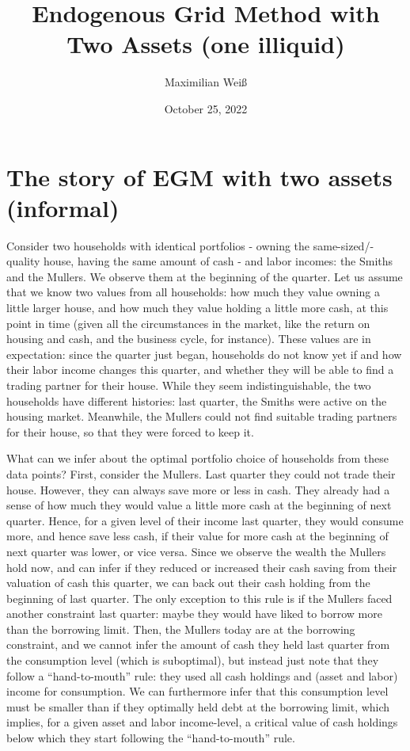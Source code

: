 \documentclass[11pt]{article} %
\title{Endogenous Grid Method with Two Assets (one illiquid)}
\author{Maximilian Weiß}
\date{October 25, 2022} %
\begin{document}
\maketitle

\section{The story of EGM with two assets (informal)}\label{sec:story}

Consider two households with identical portfolios - owning the same-sized/-quality house, having the same amount of cash - and labor incomes:
the Smiths and the Mullers. We observe them at the beginning of the quarter. Let us assume that we know two values from all households: how much they value owning a little larger house, and how much they value holding a little more cash, at this point in time
(given all the circumstances in the market, like the return on housing and cash, and the business cycle, for instance).
These values are in expectation: since the quarter just began, households do not know yet if and how their labor income changes this quarter,
and whether they will be able to find a trading partner for their house.
While they seem indistinguishable, the two households have different histories: last quarter, the Smiths were active on the housing
market. Meanwhile, the Mullers could not find suitable trading partners for their house, so that they were forced to keep it.

What can we infer about the optimal portfolio choice of households from these data points? First, consider the Mullers.
Last quarter they could not trade their house. However, they can always save more or less in cash. They already had a sense
of how much they would value a little more cash at the beginning of next quarter. Hence, for a given level of their income last quarter, they would
consume more, and hence save less cash, if their value for more cash at the beginning of next quarter was lower, or vice versa.
Since we observe the wealth the Mullers hold now, and can infer if they reduced or increased their cash saving from their valuation
of cash this quarter, we can back out their cash holding from the beginning of last quarter. The only exception to this rule is if the
Mullers faced another constraint last quarter: maybe they would have liked to borrow more than the borrowing limit. Then, the Mullers today
are at the borrowing constraint, and we cannot infer the amount of cash they held last quarter from the consumption level (which is
suboptimal), but instead just note that they follow a ``hand-to-mouth'' rule: they used all cash holdings and (asset and labor) income for consumption. We can furthermore infer that this consumption level must be smaller than if they optimally held debt at the borrowing limit, which implies, for a given asset and labor income-level, a critical value of cash holdings below which they start following the ``hand-to-mouth'' rule.
\end{document}

